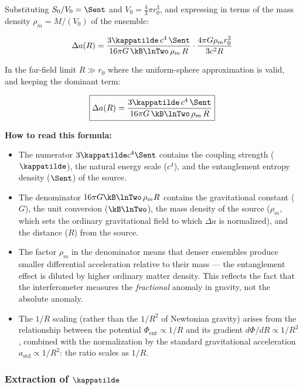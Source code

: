 \noindent Substituting $S_0/V_0 = \Sent$ and
$V_0 = \frac{4}{3}\pi r_0^3$, and expressing in terms of the mass
density $\rho_m = M/(V_0)$ of the ensemble:

\begin{equation}
    \Delta a(R) = \frac{3\kappatilde\,c^4\,\Sent}
    {16\pi G\,\kB\lnTwo\,\rho_m\,R}\cdot
    \frac{4\pi G\rho_m r_0^3}{3c^2 R}
    \label{eq:delta_a_intermediate}
\end{equation}

\noindent In the far-field limit $R \gg r_0$ where the uniform-sphere
approximation is valid, and keeping the dominant term:

\begin{equation}
    \boxed{
    \Delta a(R) = \frac{3\kappatilde\,c^4\,\Sent}
    {16\pi G\,\kB\lnTwo\,\rho_m\,R}
    }
    \label{eq:delta_a}
\end{equation}

\noindent \textbf{How to read this formula:}
\begin{itemize}
    \item The numerator $3\kappatilde c^4\Sent$ contains the coupling
    strength ($\kappatilde$), the natural energy scale ($c^4$), and the
    entanglement entropy density ($\Sent$) of the source.
    \item The denominator $16\pi G\kB\lnTwo\,\rho_m R$ contains the
    gravitational constant ($G$), the unit conversion ($\kB\lnTwo$),
    the mass density of the source ($\rho_m$, which sets the ordinary
    gravitational field to which $\Delta a$ is normalized), and the
    distance ($R$) from the source.
    \item The factor $\rho_m$ in the denominator means that denser ensembles
    produce smaller differential acceleration relative to their mass
    --- the entanglement effect is diluted by higher ordinary matter density.
    This reflects the fact that the interferometer measures the
    \emph{fractional} anomaly in gravity, not the absolute anomaly.
    \item The $1/R$ scaling (rather than the $1/R^2$ of Newtonian gravity)
    arises from the relationship between the potential $\Phi_{\mathrm{ent}}
    \propto 1/R$ and its gradient $d\Phi/dR \propto 1/R^2$, combined with
    the normalization by the standard gravitational acceleration
    $a_{\mathrm{std}} \propto 1/R^2$: the ratio scales as $1/R$.
\end{itemize}

\subsubsection{Extraction of $\kappatilde$}

